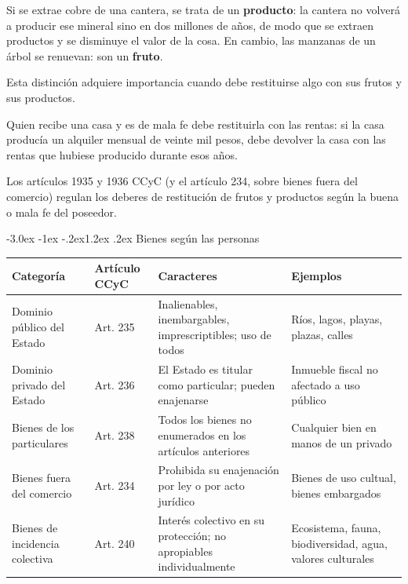 \documentclass[12pt,oneside]{book}
\makeatletter
\renewcommand\section{\@startsection{section}{1}{\z@}%
  {-3.0ex \@plus -1ex \@minus -.2ex}{1.2ex \@plus .2ex}%
  {\normalfont\large\bfseries\color{acento}}}
\newenvironment{tabla}{%
    \par\medskip\begingroup\small\renewcommand{\arraystretch}{1.3}\noindent\ignorespaces
}{%
    \par\endgroup\medskip
}
\makeatother
\begin{document}
\begin{ejemplo}
Si se extrae cobre de una cantera, se trata de un \textbf{producto}: la cantera no volverá a producir ese mineral sino en dos millones de años, de modo que se extraen productos y se disminuye el valor de la cosa. En cambio, las manzanas de un árbol se renuevan: son un \textbf{fruto}.
\end{ejemplo}

Esta distinción adquiere importancia cuando debe restituirse algo con sus frutos y sus productos.

\begin{ejemplo}
Quien recibe una casa y es de mala fe debe restituirla con las rentas: si la casa producía un alquiler mensual de veinte mil pesos, debe devolver la casa con las rentas que hubiese producido durante esos años.
\end{ejemplo}

Los artículos 1935 y 1936 CCyC (y el artículo 234, sobre bienes fuera del comercio) regulan los deberes de restitución de frutos y productos según la buena o mala fe del poseedor.

\section{Bienes según las personas}

\begin{tabla}
\begin{tabularx}{\textwidth}{B{2.9cm}P{1.7cm}YY}
\toprule
Categoría & \textbf{Artículo CCyC} & \textbf{Caracteres} & \textbf{Ejemplos} \\
\midrule
Dominio público del Estado & Art. 235 & Inalienables, inembargables, imprescriptibles; uso de todos & Ríos, lagos, playas, plazas, calles \\
Dominio privado del Estado & Art. 236 & El Estado es titular como particular; pueden enajenarse & Inmueble fiscal no afectado a uso público \\
Bienes de los particulares & Art. 238 & Todos los bienes no enumerados en los artículos anteriores & Cualquier bien en manos de un privado \\
Bienes fuera del comercio & Art. 234 & Prohibida su enajenación por ley o por acto jurídico & Bienes de uso cultual, bienes embargados \\
Bienes de incidencia colectiva & Art. 240 & Interés colectivo en su protección; no apropiables individualmente & Ecosistema, fauna, biodiversidad, agua, valores culturales \\
\bottomrule
\end{tabularx}
\end{tabla}
\end{document}
